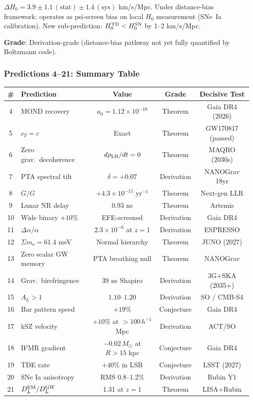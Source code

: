 \documentclass[11pt,a4paper]{article}
\begin{document}
$\Delta H_0 = 3.9 \pm 1.1\,(\text{stat}) \pm 1.4\,(\text{sys})$ km/s/Mpc. Under distance-bias framework: operates as psi-screen bias on local $H_0$ measurement (SNe~Ia calibration). New sub-prediction: $H_0^{\rm TD} < H_0^{\rm SN}$ by 1--2 km/s/Mpc.

\textbf{Grade}: Derivation-grade (distance-bias pathway not yet fully quantified by Boltzmann code).

\subsubsection{Predictions 4--21: Summary Table}

\begin{center}
\begin{longtable}{clccc}
\toprule
\textbf{\#} & \textbf{Prediction} & \textbf{Value} & \textbf{Grade} & \textbf{Decisive Test} \\
\midrule
4 & MOND recovery & $a_0 = 1.12 \times 10^{-10}$ & Theorem & Gaia DR4 (2026) \\
5 & $c_T = c$ & Exact & Theorem & GW170817 (passed) \\
6 & Zero grav.\ decoherence & $d\rho_{\rm LR}/dt = 0$ & Theorem & MAQRO (2030s) \\
7 & PTA spectral tilt & $\delta = +0.07$ & Derivation & NANOGrav 18yr \\
8 & $\dot{G}/G$ & $+4.3 \times 10^{-15}$ yr$^{-1}$ & Theorem & Next-gen LLR \\
9 & Lunar NR delay & 0.93 ns & Theorem & Artemis \\
10 & Wide binary $+10\%$ & EFE-screened & Derivation & Gaia DR4 \\
11 & $\Delta\alpha/\alpha$ & $2.3 \times 10^{-6}$ at $z=1$ & Derivation & ESPRESSO \\
12 & $\Sigma m_\nu = 61.4$ meV & Normal hierarchy & Theorem & JUNO (2027) \\
13 & Zero scalar GW memory & PTA breathing null & Theorem & NANOGrav \\
14 & Grav.\ birefringence & 39 ns Shapiro & Derivation & 3G+SKA (2035+) \\
15 & $A_L > 1$ & $1.10$--$1.20$ & Derivation & SO / CMB-S4 \\
16 & Bar pattern speed & $+19\%$ & Conjecture & Gaia DR4 \\
17 & kSZ velocity & $+10\%$ at $>100\,h^{-1}$ Mpc & Derivation & ACT/SO \\
18 & IFMR gradient & $-0.02\,M_\odot$ at $R > 15$ kpc & Conjecture & Gaia DR4 \\
19 & TDE rate & $+40\%$ in LSB & Conjecture & LSST (2027) \\
20 & SNe Ia anisotropy & RMS 0.8--1.2\% & Derivation & Rubin Y1 \\
21 & $D_L^{\rm EM}/D_L^{\rm GW}$ & 1.31 at $z=1$ & Theorem & LISA+Rubin \\
\bottomrule
\end{longtable}
\end{center}
\end{document}

